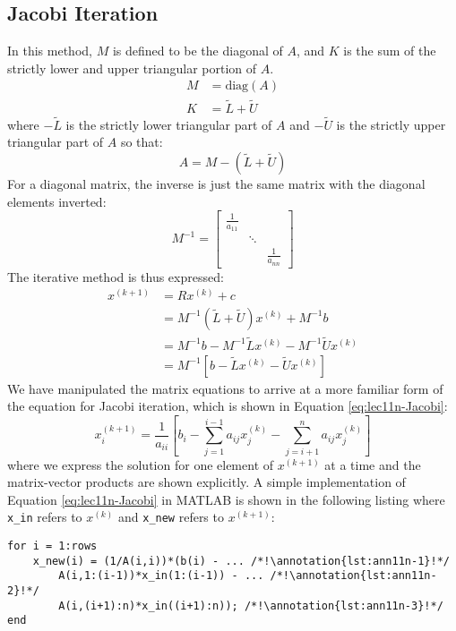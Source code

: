 \subsection{Jacobi Iteration}

In this method, $M$ is defined to be the diagonal of $A$, and $K$ is the sum of the strictly lower and upper triangular portion of $A$.
\begin{align}
M &= \text{diag}(A) \\
K &= \tilde{L} + \tilde{U}
\end{align}
where $-\tilde{L}$ is the strictly lower triangular part of $A$ and $-\tilde{U}$ is the strictly upper triangular part of $A$ so that:
\begin{equation*}
A = M - (\tilde{L} + \tilde{U})
\end{equation*}
For a diagonal matrix, the inverse is just the same matrix with the diagonal elements inverted:
\begin{equation*}
M^{-1} = \left[
\begin{matrix}
\frac{1}{a_{11}} & &  \\
 & \ddots & \\
 & & \frac{1}{a_{nn}} 
 \end{matrix}
\right]
\end{equation*}
The iterative method is thus expressed:
\begin{align*}
x^{(k+1)} &= Rx^{(k)} + c \\
&=M^{-1}(\tilde{L} + \tilde{U})x^{(k)} + M^{-1}b \\
&=M^{-1}b - M^{-1}\tilde{L}x^{(k)} - M^{-1}\tilde{U}x^{(k)} \\
&=M^{-1}\left[b - \tilde{L}x^{(k)} - \tilde{U}x^{(k)}\right]
\end{align*}
We have manipulated the matrix equations to arrive at a more familiar form of the equation for Jacobi iteration, which is shown in Equation \ref{eq:lec11n-Jacobi}:
\begin{equation}
x_i^{(k+1)} = \frac{1}{a_{ii}}\left[b_{i} - \sum\limits_{j=1}^{i-1}a_{ij}x_{j}^{(k)} - \sum\limits_{j=i+1}^{n}a_{ij}x_j^{(k)} \right]
\label{eq:lec11n-Jacobi}
\end{equation}
where we express the solution for one element of $x^{(k+1)}$ at a time and the matrix-vector products are shown explicitly. A simple implementation of Equation \ref{eq:lec11n-Jacobi} in MATLAB is shown in the following listing where \lstinline[style=myMatlab]{x_in} refers to $x^{(k)}$ and \lstinline[style=myMatlab]{x_new} refers to $x^{(k+1)}$:
\begin{lstlisting}[style=myMatlab]
for i = 1:rows
    x_new(i) = (1/A(i,i))*(b(i) - ... /*!\annotation{lst:ann11n-1}!*/
        A(i,1:(i-1))*x_in(1:(i-1)) - ... /*!\annotation{lst:ann11n-2}!*/
        A(i,(i+1):n)*x_in((i+1):n)); /*!\annotation{lst:ann11n-3}!*/
end
\end{lstlisting}
